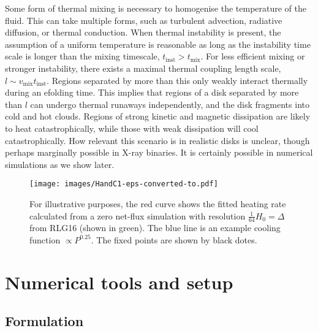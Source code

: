 \documentclass[useAMS]{mn2e}
\begin{document}
Some form of thermal mixing is
necessary to homogenise the temperature of the fluid. This can take
multiple forms, such as turbulent advection, radiative diffusion, or
thermal conduction. When thermal instability is present, the assumption of a
uniform temperature is reasonable as long as the instability time scale is
longer than the mixing timescale, $t_{\text{inst}}>t_{\text{mix}}$. For less
efficient mixing or stronger instability, there exists a maximal thermal coupling
length scale, $l\sim v_{\text{mix}}t_{\text{inst}}$. Regions separated by more than
this only weakly interact thermally during an efolding time. This implies
that regions of a disk separated by more than $l$ can undergo thermal runaways
independently, and the disk fragments into cold and hot clouds. 
 Regions of strong kinetic and magnetic dissipation are
likely to heat catastrophically, while those with weak dissipation will
cool catastrophically. How relevant this
scenario is in realistic disks is unclear, though perhaps marginally
possible in X-ray binaries. It is certainly possible in
numerical simulations as we show later.



\begin{figure}
\texttt{[image: images/HandC1-eps-converted-to.pdf]}
\caption{For illustrative purposes, the red curve shows the fitted
  heating rate calculated from a zero net-flux simulation with
  resolution $\frac{1}{64}H_{0}=\Delta$ from RLG16 (shown in green).  
  The blue line is an example cooling function $\propto P^{0.25}$. 
  The fixed points are shown by black dotes.}
\label{Fig:HandC}
\end{figure}


\section{Numerical tools and setup} %

\subsection{Formulation}
\end{document}
